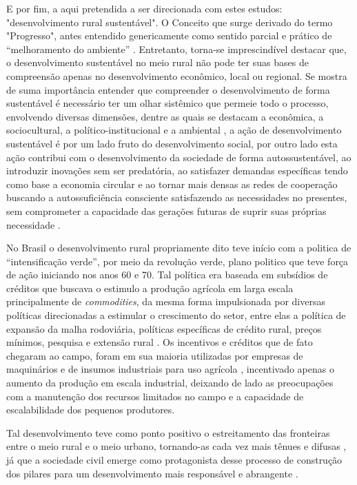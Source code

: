 E por fim, a aqui pretendida a ser direcionada com estes estudos: "desenvolvimento rural sustentável". O Conceito que surge derivado do termo "Progresso", antes entendido genericamente como sentido parcial e prático de “melhoramento do ambiente” \cite{almeida_da_1995}. Entretanto, torna-se imprescindível destacar que, o desenvolvimento sustentável no meio rural não pode ter suas bases de compreensão apenas no desenvolvimento econômico, local ou regional. Se mostra de suma importância entender que compreender o desenvolvimento de forma sustentável é necessário ter um olhar sistêmico que permeie todo o processo, envolvendo diversas dimensões, dentre as quais se destacam a econômica, a sociocultural, a político-institucional e a ambiental \cite{vieira_politica_2015}, a ação de desenvolvimento sustentável é por um lado fruto do desenvolvimento social, por outro lado esta ação contribui com o desenvolvimento da sociedade de forma autossustentável, ao introduzir inovações sem ser predatória, ao satisfazer demandas específicas tendo como base a economia circular e ao tornar mais densas as redes de cooperação buscando a autossuficiência consciente  satisfazendo as necessidades no presentes, sem comprometer a capacidade das gerações futuras de suprir suas próprias necessidade \cite{onu_sustainable_2016}.

No Brasil o desenvolvimento rural propriamente dito teve início com a politica de “intensificação verde”, por meio da revolução verde, plano politico que teve força de ação iniciando nos anos 60 e 70. Tal política era baseada em subsídios de créditos que buscava o estimulo a produção agrícola em larga escala principalmente de \textit{commodities}, da mesma forma impulsionada por diversas políticas direcionadas a estimular o crescimento do setor, entre elas a política de expansão da malha rodoviária, políticas específicas de crédito rural, preços mínimos, pesquisa e extensão rural \cite{kageyama_o_1990}. Os incentivos e créditos que de fato chegaram ao campo, foram em sua maioria utilizadas por empresas de maquinários e de insumos industriais para uso agrícola \cite{strassburg_producao_2015}, incentivado apenas o aumento da produção em escala industrial, deixando de lado as preocupações com a manutenção dos recursos limitados no campo e a capacidade de escalabilidade dos pequenos produtores.

Tal desenvolvimento teve como ponto positivo o estreitamento das fronteiras entre o meio rural e o meio urbano, tornando-as cada vez mais tênues e difusas \cite{freitas_mudancas_2012}, já que a sociedade civil emerge como protagonista desse processo de construção dos pilares para um desenvolvimento mais responsável e abrangente \cite{de_souza_empreendedorismo_2016}. 


